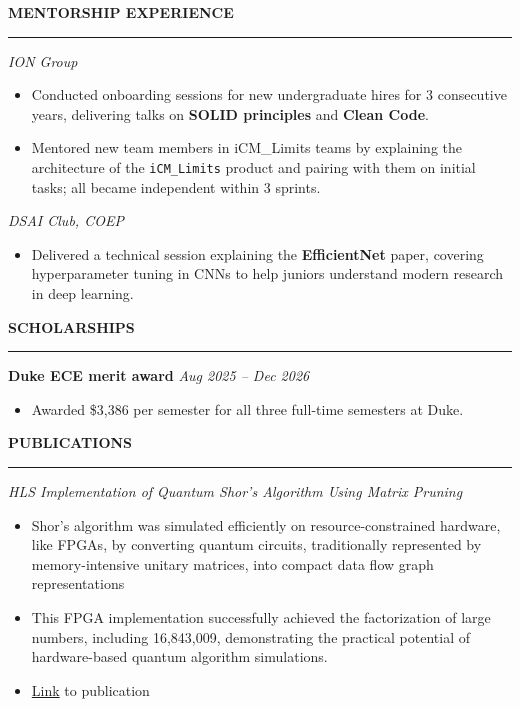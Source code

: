 \documentclass[a4paper,10pt]{article}
\newcommand{\cvHeaderOne}[1]{%
  \vspace*{1.5em}%
  {\noindent\large\textbf{\MakeUppercase{#1}}\par}%
  \noindent\rule{\linewidth}{0.4pt}%
  \vspace*{0.5em}%
}
\newcommand{\cvHeaderTwo}[2]{%
  \vspace{0.8em}%
  \noindent\textbf{\normalsize #1} \hfill \textit{#2}\par%
}
\newcommand{\cvHeaderThree}[1]{%
  \noindent\textit{#1}%
}
\newenvironment{cvItemList}{%
  \begin{itemize}%
    \setlength{\itemsep}{0.1em}%
    \setlength{\topsep}{0em}%
    \setlength{\partopsep}{0em}%
    \setlength{\parsep}{0em}%
    \setlength{\parskip}{0em}%
}{%
  \end{itemize}%
}
\begin{document}
\cvHeaderOne{Mentorship Experience}

\cvHeaderThree{ION Group}
\begin{cvItemList}
  \item Conducted onboarding sessions for new undergraduate hires for 3 consecutive years, delivering talks on \textbf{SOLID principles} and \textbf{Clean Code}.
  \item Mentored new team members in iCM\_Limits teams by explaining the architecture of the \texttt{iCM\_Limits} product and pairing with them on initial tasks; all became independent within 3 sprints.
\end{cvItemList}

\cvHeaderThree{DSAI Club, COEP}
\begin{cvItemList}
  \item Delivered a technical session explaining the \textbf{EfficientNet} paper, covering hyperparameter tuning in CNNs to help juniors understand modern research in deep learning.
\end{cvItemList}

\cvHeaderOne{Scholarships}
\cvHeaderTwo{Duke ECE merit award}{Aug 2025 -- Dec 2026}
\begin{cvItemList}
  \item Awarded \$3{,}386 per semester for all three full-time semesters at Duke.
\end{cvItemList}

\newpage

\cvHeaderOne{Publications}

\cvHeaderThree{HLS Implementation of Quantum Shor’s Algorithm Using Matrix Pruning}
\begin{cvItemList}
\item Shor's algorithm was simulated efficiently on resource-constrained hardware, like FPGAs, by converting quantum circuits, traditionally represented by memory-intensive unitary matrices, into compact data flow graph representations
\item This FPGA implementation successfully achieved the factorization of large numbers, including 16,843,009, demonstrating the practical potential of hardware-based quantum algorithm simulations.
\item \href{https://ieeexplore.ieee.org/document/9807860}{Link} to publication
\end{cvItemList}
\end{document}
